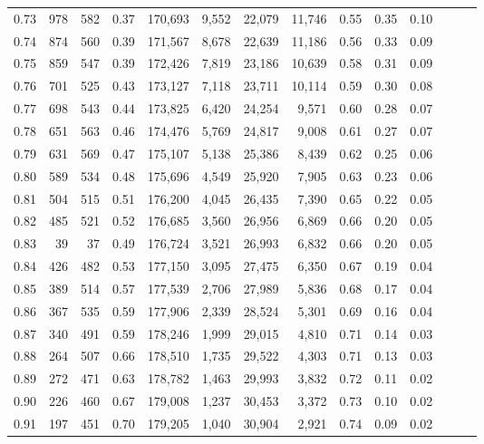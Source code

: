 \begin{tabular}{rrrrrrrrrrrrrr}
0.73 &    978 &  582 &  0.37 &  170,693 &    9,552 &  22,079 &  11,746 &  0.55 &  0.35 &      0.10 \\
0.74 &    874 &  560 &  0.39 &  171,567 &    8,678 &  22,639 &  11,186 &  0.56 &  0.33 &      0.09 \\
0.75 &    859 &  547 &  0.39 &  172,426 &    7,819 &  23,186 &  10,639 &  0.58 &  0.31 &      0.09 \\
0.76 &    701 &  525 &  0.43 &  173,127 &    7,118 &  23,711 &  10,114 &  0.59 &  0.30 &      0.08 \\
0.77 &    698 &  543 &  0.44 &  173,825 &    6,420 &  24,254 &   9,571 &  0.60 &  0.28 &      0.07 \\
0.78 &    651 &  563 &  0.46 &  174,476 &    5,769 &  24,817 &   9,008 &  0.61 &  0.27 &      0.07 \\
0.79 &    631 &  569 &  0.47 &  175,107 &    5,138 &  25,386 &   8,439 &  0.62 &  0.25 &      0.06 \\
0.80 &    589 &  534 &  0.48 &  175,696 &    4,549 &  25,920 &   7,905 &  0.63 &  0.23 &      0.06 \\
0.81 &    504 &  515 &  0.51 &  176,200 &    4,045 &  26,435 &   7,390 &  0.65 &  0.22 &      0.05 \\
0.82 &    485 &  521 &  0.52 &  176,685 &    3,560 &  26,956 &   6,869 &  0.66 &  0.20 &      0.05 \\
0.83 &     39 &   37 &  0.49 &  176,724 &    3,521 &  26,993 &   6,832 &  0.66 &  0.20 &      0.05 \\
0.84 &    426 &  482 &  0.53 &  177,150 &    3,095 &  27,475 &   6,350 &  0.67 &  0.19 &      0.04 \\
0.85 &    389 &  514 &  0.57 &  177,539 &    2,706 &  27,989 &   5,836 &  0.68 &  0.17 &      0.04 \\
0.86 &    367 &  535 &  0.59 &  177,906 &    2,339 &  28,524 &   5,301 &  0.69 &  0.16 &      0.04 \\
0.87 &    340 &  491 &  0.59 &  178,246 &    1,999 &  29,015 &   4,810 &  0.71 &  0.14 &      0.03 \\
0.88 &    264 &  507 &  0.66 &  178,510 &    1,735 &  29,522 &   4,303 &  0.71 &  0.13 &      0.03 \\
0.89 &    272 &  471 &  0.63 &  178,782 &    1,463 &  29,993 &   3,832 &  0.72 &  0.11 &      0.02 \\
0.90 &    226 &  460 &  0.67 &  179,008 &    1,237 &  30,453 &   3,372 &  0.73 &  0.10 &      0.02 \\
0.91 &    197 &  451 &  0.70 &  179,205 &    1,040 &  30,904 &   2,921 &  0.74 &  0.09 &      0.02 \\

\end{tabular}
